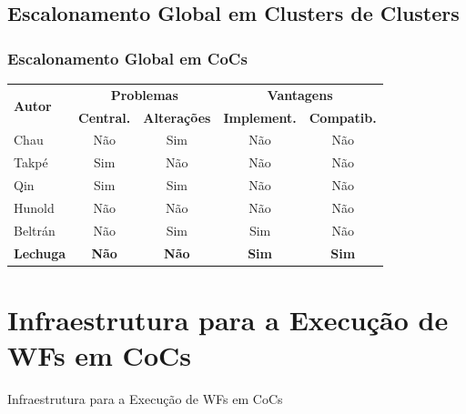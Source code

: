 \documentclass[red, cover=invisible, theme=Warsaw]{myslides}
\begin{document}
    \subsection{Escalonamento Global em Clusters de Clusters}
	\begin{frame}\frametitle{Escalonamento Global em CoCs}
	    \begin{table}[!htb]
		\centering
		\small
		\begin{tabular}{l||c|c|c|c} %
		    \hline
		    \multirow{2}{2cm}{\textbf{Autor}} & \multicolumn{2}{c|}{\textbf{Problemas}} & \multicolumn{2}{c}{\textbf{Vantagens}} \\
		    \cline{2-5}
		    & \textbf{Central.} & \textbf{Alterações} & \textbf{Implement.} & \textbf{Compatib.} \\

		    \hline
		    \hline

		    Chau     & Não & Sim & Não & Não \\ 
		    Takpé    & Sim & Não & Não & Não \\
		    Qin	     & Sim & Sim & Não & Não \\
		    Hunold   & Não & Não & Não & Não \\
		    Beltrán  & Não & Sim & Sim & Não \\
		    \textbf{Lechuga} & \textbf{Não} & \textbf{Não} & \textbf{Sim} & \textbf{Sim} \\ 

		    \hline
		\end{tabular}
	    \end{table}
	\end{frame}
    
\section{Infraestrutura para a Execução de WFs em CoCs}
    \begin{frame}
	\begin{center}
	{\Huge Infraestrutura para a Execução de WFs em CoCs}
	\end{center}
    \end{frame}
    
\end{document}
